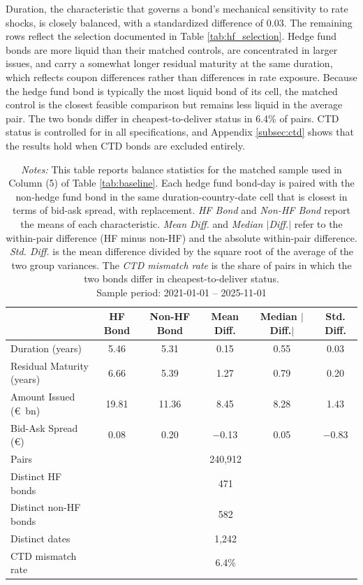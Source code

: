 \documentclass[english, 11pt, oneside]{article}
\begin{document}
Duration, the characteristic that governs a bond's mechanical sensitivity to rate shocks, is closely balanced, with a standardized difference of 0.03. The remaining rows reflect the selection documented in Table \ref{tab:hf_selection}. Hedge fund bonds are more liquid than their matched controls, are concentrated in larger issues, and carry a somewhat longer residual maturity at the same duration, which reflects coupon differences rather than differences in rate exposure. Because the hedge fund bond is typically the most liquid bond of its cell, the matched control is the closest feasible comparison but remains less liquid in the average pair. The two bonds differ in cheapest-to-deliver status in 6.4\% of pairs. CTD status is controlled for in all specifications, and Appendix \ref{subsec:ctd} shows that the results hold when CTD bonds are excluded entirely. 

\begin{table}[h!]
\centering
\caption{\textbf{Matched-Pair Balance}}
\footnotesize
\setlength{\tabcolsep}{8pt}
\renewcommand{\arraystretch}{1.1}
\begin{tabular}{l c c c c c}
\toprule
 & HF Bond & Non-HF Bond & Mean Diff. & Median $|$Diff.$|$ & Std. Diff. \\
\midrule
Duration (years) & 5.46 & 5.31 & 0.15 & 0.55 & 0.03 \\
Residual Maturity (years) & 6.66 & 5.39 & 1.27 & 0.79 & 0.20 \\
Amount Issued (\euro\ bn) & 19.81 & 11.36 & 8.45 & 8.28 & 1.43 \\
Bid-Ask Spread (\euro) & 0.08 & 0.20 & $-$0.13 & 0.05 & $-$0.83 \\
\midrule
Pairs & \multicolumn{5}{c}{240,912} \\
Distinct HF bonds & \multicolumn{5}{c}{471} \\
Distinct non-HF bonds & \multicolumn{5}{c}{582} \\
Distinct dates & \multicolumn{5}{c}{1,242} \\
CTD mismatch rate & \multicolumn{5}{c}{6.4\%} \\
\bottomrule
\end{tabular}
\label{tab:pair_balance}
\caption*{\textit{Notes:} This table reports balance statistics for the matched sample used in Column (5) of Table \ref{tab:baseline}. Each hedge fund bond-day is paired with the non-hedge fund bond in the same duration-country-date cell that is closest in terms of bid-ask spread, with replacement. \textit{HF Bond} and \textit{Non-HF Bond} report the means of each characteristic. \textit{Mean Diff.} and \textit{Median $|$Diff.$|$} refer to the within-pair difference (HF minus non-HF) and the absolute within-pair difference. \textit{Std. Diff.} is the mean difference divided by the square root of the average of the two group variances. The \textit{CTD mismatch rate} is the share of pairs in which the two bonds differ in cheapest-to-deliver status. \\ Sample period: 2021-01-01 -- 2025-11-01}
\end{table}
\end{document}
